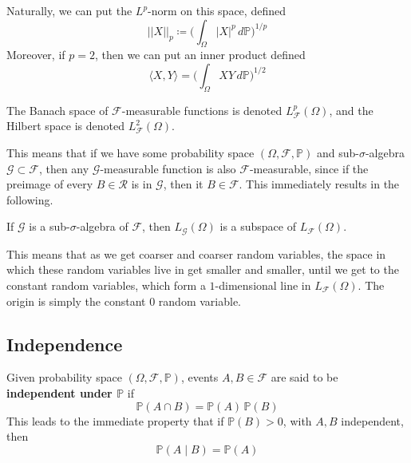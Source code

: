 \documentclass{article}
\begin{document}
      Naturally, we can put the $L^p$-norm on this space, defined 
      \begin{equation}
        ||X||_p \coloneqq \bigg( \int_\Omega |X|^p \, d\mathbb{P} \bigg)^{1/p}
      \end{equation}
      Moreover, if $p = 2$, then we can put an inner product defined 
      \begin{equation}
        \langle X, Y \rangle = \bigg( \int_\Omega X Y \,d \mathbb{P} \bigg)^{1/2}
      \end{equation}

      \begin{definition}
        The Banach space of $\mathcal{F}$-measurable functions is denoted $L_\mathcal{F}^p (\Omega)$, and the Hilbert space is denoted $L_\mathcal{F}^2 (\Omega)$. 
      \end{definition}

      This means that if we have some probability space $(\Omega, \mathcal{F}, \mathbb{P})$ and  sub-$\sigma$-algebra $\mathcal{G} \subset \mathcal{F}$, then any $\mathcal{G}$-measurable function is also $\mathcal{F}$-measurable, since if the preimage of every $B \in \mathcal{R}$ is in $\mathcal{G}$, then it $B \in \mathcal{F}$. This immediately results in the following. 

      \begin{theorem}
        If $\mathcal{G}$ is a sub-$\sigma$-algebra of $\mathcal{F}$, then $L_\mathcal{G} (\Omega)$ is a subspace of $L_\mathcal{F} (\Omega)$. 
      \end{theorem}

      This means that as we get coarser and coarser random variables, the space in which these random variables live in get smaller and smaller, until we get to the constant random variables, which form a $1$-dimensional line in $L_\mathcal{F} (\Omega)$. The origin is simply the constant $0$ random variable. 

  \subsection{Independence}

    \begin{definition}
      Given probability space $(\Omega, \mathcal{F}, \mathbb{\mathbb{P}})$, events $A, B \in \mathcal{F}$ are said to be \textbf{independent under $\mathbf{\mathbb{P}}$} if 
      \begin{equation}
        \mathbb{P}(A \cap B) = \mathbb{P}(A) \, \mathbb{P}(B)
      \end{equation}
      This leads to the immediate property that if $\mathbb{P}(B) > 0$, with $A, B$ independent, then 
      \begin{equation}
        \mathbb{P}(A \mid B) = \mathbb{P}(A)
      \end{equation}
    \end{definition}
\end{document}
